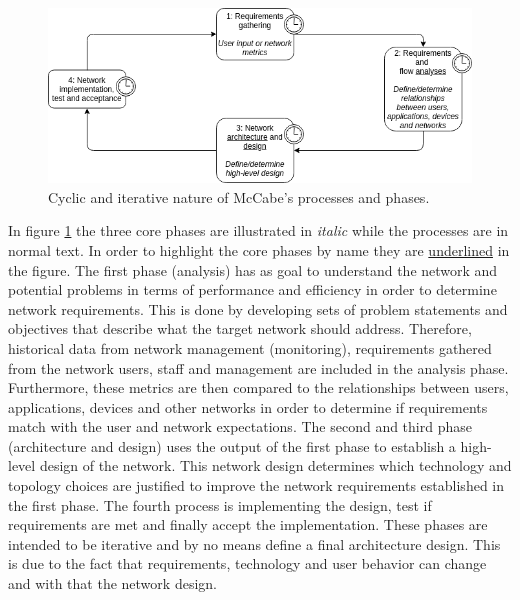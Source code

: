 \documentclass[conference]{IEEEtran}
\begin{document}
\begin{figure}[H]
\centering
\includegraphics[width=\columnwidth]{images/mccabe-process.png}
\caption{Cyclic and iterative nature of McCabe's processes and phases.}
\label{fig:mccabe-process}
\end{figure}

In figure \ref{fig:mccabe-process} the three core phases are illustrated in \textit{italic} while the processes are in normal text. In order to highlight the core phases by name they are \underline{underlined} in the figure. The first phase (analysis) has as goal to understand the network and potential problems in terms of performance and efficiency in order to determine network requirements. This is done by developing sets of problem statements and objectives that describe what the target network should address. Therefore, historical data from network management (monitoring), requirements gathered from the network users, staff and management are included in the analysis phase. Furthermore, these metrics are then compared to the relationships between users, applications, devices and other networks in order to determine if requirements match with the user and network expectations. The second and third phase (architecture and design) uses the output of the first phase to establish a high-level design of the network. This network design determines which technology and topology choices are justified to improve the network requirements established in the first phase. The fourth process is implementing the design, test if requirements are met and finally accept the implementation. These phases are intended to be iterative and by no means define a final architecture design. This is due to the fact that requirements, technology and user behavior can change and with that the network design.
\end{document}
